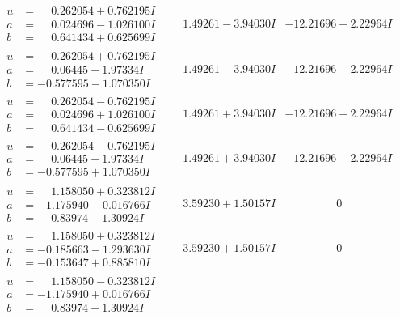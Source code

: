 \documentclass[1p]{elsarticle_modified}
\theoremstyle{definition}
\begin{document}
$$\begin{array}{c|c|c}
\begin{aligned}
u &= \phantom{-}0.262054 + 0.762195 I \\
a &= \phantom{-}0.024696 - 1.026100 I \\
b &= \phantom{-}0.641434 + 0.625699 I\end{aligned}
 & \phantom{-}1.49261 - 3.94030 I & -12.21696 + 2.22964 I \\ \hline\begin{aligned}
u &= \phantom{-}0.262054 + 0.762195 I \\
a &= \phantom{-}0.06445 + 1.97334 I \\
b &= -0.577595 - 1.070350 I\end{aligned}
 & \phantom{-}1.49261 - 3.94030 I & -12.21696 + 2.22964 I \\ \hline\begin{aligned}
u &= \phantom{-}0.262054 - 0.762195 I \\
a &= \phantom{-}0.024696 + 1.026100 I \\
b &= \phantom{-}0.641434 - 0.625699 I\end{aligned}
 & \phantom{-}1.49261 + 3.94030 I & -12.21696 - 2.22964 I \\ \hline\begin{aligned}
u &= \phantom{-}0.262054 - 0.762195 I \\
a &= \phantom{-}0.06445 - 1.97334 I \\
b &= -0.577595 + 1.070350 I\end{aligned}
 & \phantom{-}1.49261 + 3.94030 I & -12.21696 - 2.22964 I \\ \hline\begin{aligned}
u &= \phantom{-}1.158050 + 0.323812 I \\
a &= -1.175940 - 0.016766 I \\
b &= \phantom{-}0.83974 - 1.30924 I\end{aligned}
 & \phantom{-}3.59230 + 1.50157 I & \phantom{-0.000000 } 0 \\ \hline\begin{aligned}
u &= \phantom{-}1.158050 + 0.323812 I \\
a &= -0.185663 - 1.293630 I \\
b &= -0.153647 + 0.885810 I\end{aligned}
 & \phantom{-}3.59230 + 1.50157 I & \phantom{-0.000000 } 0 \\ \hline\begin{aligned}
u &= \phantom{-}1.158050 - 0.323812 I \\
a &= -1.175940 + 0.016766 I \\
b &= \phantom{-}0.83974 + 1.30924 I\end{aligned}

\end{array}$$
\end{document}
